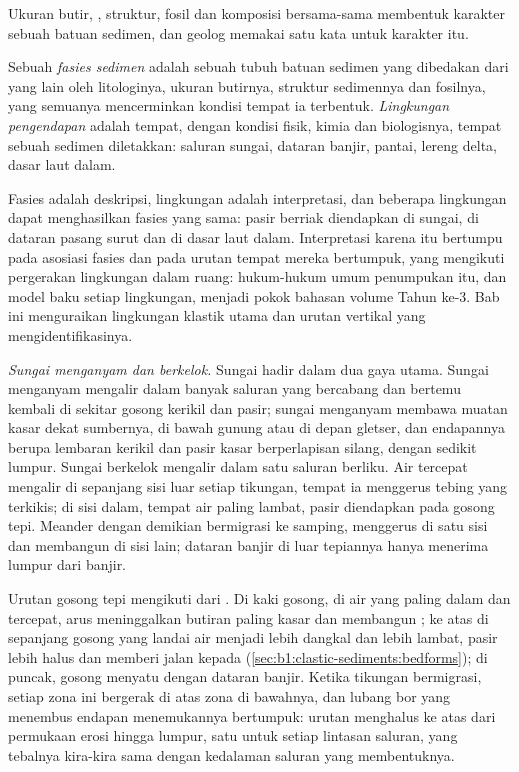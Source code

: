 Ukuran butir, , struktur, fosil dan komposisi bersama-sama membentuk karakter sebuah batuan sedimen, dan geolog memakai satu kata untuk karakter itu.

\begin{definition}\label{def:b1:clastic-sediments:facies}
Sebuah \emph{fasies sedimen} adalah sebuah tubuh batuan sedimen yang dibedakan dari yang lain oleh litologinya, ukuran butirnya, struktur sedimennya dan fosilnya, yang semuanya mencerminkan kondisi tempat ia terbentuk. \emph{Lingkungan pengendapan} adalah tempat, dengan kondisi fisik, kimia dan biologisnya, tempat sebuah sedimen diletakkan: saluran sungai, dataran banjir, pantai, lereng delta, dasar laut dalam.
\end{definition}

Fasies adalah deskripsi, lingkungan adalah interpretasi, dan beberapa lingkungan dapat menghasilkan fasies yang sama: pasir berriak diendapkan di sungai, di dataran pasang surut dan di dasar laut dalam. Interpretasi karena itu bertumpu pada asosiasi fasies dan pada urutan tempat mereka bertumpuk, yang mengikuti pergerakan lingkungan dalam ruang: hukum-hukum umum penumpukan itu, dan model baku setiap lingkungan, menjadi pokok bahasan volume Tahun ke-3. Bab ini menguraikan lingkungan klastik utama dan urutan vertikal yang mengidentifikasinya.

\emph{Sungai menganyam dan berkelok.} Sungai hadir dalam dua gaya utama. Sungai menganyam mengalir dalam banyak saluran yang bercabang dan bertemu kembali di sekitar gosong kerikil dan pasir; sungai menganyam membawa muatan kasar dekat sumbernya, di bawah gunung atau di depan gletser, dan endapannya berupa lembaran kerikil dan pasir kasar berperlapisan silang, dengan sedikit lumpur. Sungai berkelok mengalir dalam satu saluran berliku. Air tercepat mengalir di sepanjang sisi luar setiap tikungan, tempat ia menggerus tebing yang terkikis; di sisi dalam, tempat air paling lambat, pasir diendapkan pada gosong tepi. Meander dengan demikian bermigrasi ke samping, menggerus di satu sisi dan membangun di sisi lain; dataran banjir di luar tepiannya hanya menerima lumpur dari banjir.

Urutan gosong tepi mengikuti dari . Di kaki gosong, di air yang paling dalam dan tercepat, arus meninggalkan butiran paling kasar dan membangun ; ke atas di sepanjang gosong yang landai air menjadi lebih dangkal dan lebih lambat, pasir lebih halus dan  memberi jalan kepada  (\cref{sec:b1:clastic-sediments:bedforms}); di puncak, gosong menyatu dengan dataran banjir. Ketika tikungan bermigrasi, setiap zona ini bergerak di atas zona di bawahnya, dan lubang bor yang menembus endapan menemukannya bertumpuk: urutan menghalus ke atas dari permukaan erosi hingga lumpur, satu untuk setiap lintasan saluran, yang tebalnya kira-kira sama dengan kedalaman saluran yang membentuknya.


